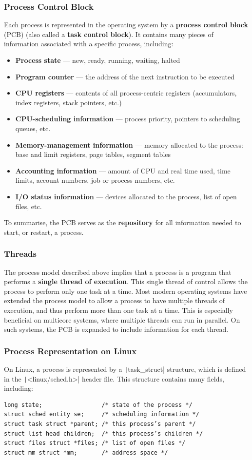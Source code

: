 \documentclass{article}
\begin{document}
\subsubsection{Process Control Block}
Each process is represented in the operating system by a
\textbf{process control block} (PCB) (also called a \textbf{task
control block}). It contains many pieces of information associated with
a specific process, including:
\begin{itemize}
    \item \textbf{Process state} --- new, ready, running, waiting, halted
    \item \textbf{Program counter} --- the address of the next
          instruction to be executed
    \item \textbf{CPU registers} --- contents of all process-centric
          registers (accumulators, index registers, stack pointers, etc.)
    \item \textbf{CPU-scheduling information} --- process priority, pointers to scheduling queues, etc.
    \item \textbf{Memory-management information} --- memory allocated to the process: base and limit registers, page tables, segment tables
    \item \textbf{Accounting information} --- amount of CPU and real time used, time limits, account numbers, job or process numbers, etc.
    \item \textbf{I/O status information} --- devices allocated to the process, list of open files, etc.
\end{itemize}
To summarise, the PCB serves as the \textbf{repository} for all
information needed to start, or restart, a process.
\subsubsection{Threads}
The process model described above implies that a process is a program
that performs a \textbf{single thread of execution}. This single thread
of control allows the process to perform only one task at a time. Most
modern operating systems have extended the process model to allow a
process to have multiple threads of execution, and thus perform more
than one task at a time. This is especially beneficial on multicore
systems, where multiple threads can run in parallel. On such systems,
the PCB is expanded to include information for each thread.
\subsubsection{Process Representation on Linux}
On Linux, a process is represented by a \texttt|task_struct|
structure, which is defined in the \texttt|<linux/sched.h>|
header file. This structure contains many fields, including:
\begin{verbatim}
long state;                 /* state of the process */
struct sched entity se;     /* scheduling information */
struct task struct *parent; /* this process’s parent */
struct list head children;  /* this process’s children */
struct files struct *files; /* list of open files */
struct mm struct *mm;       /* address space */
\end{verbatim}
\end{document}
